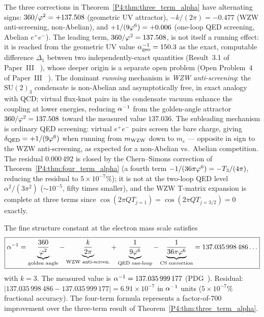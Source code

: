 \begin{remark}
\label{P4:rem:sign_pattern}
The three corrections in Theorem~\ref{P4:thm:three_term_alpha} have
alternating signs: $360/\varphi^2=+137.508$ (geometric UV attractor),
$-k/(2\pi)=-0.477$ (WZW anti-screening, non-Abelian), and
$+1/(9\varphi^6)=+0.006$ (one-loop QED screening, Abelian $e^+e^-$).
The leading term, $360/\varphi^2=137.508$, is not itself a running effect:
it is reached from the geometric UV value $\alpha^{-1}_{\mathrm{geo}}=150.3$
as the exact, computable difference $\Delta_1$ between two
independently-exact quantities (Result~3.1 of Paper~III~\cite{Paper3}%
), whose deeper origin is a separate open problem
(Open Problem~4 of Paper~III~\cite{Paper3}%
).
The dominant \emph{running} mechanism is \emph{WZW anti-screening}: the
$\mathrm{SU}(2)_3$ condensate is non-Abelian and asymptotically free, in
exact analogy with QCD; virtual flux-knot pairs in the condensate vacuum
enhance the coupling at lower energies, reducing $\alpha^{-1}$ from the
golden-angle attractor $360/\varphi^2=137.508$ toward the measured value
$137.036$.
The subleading mechanism is ordinary QED screening: virtual $e^+e^-$ pairs
screen the bare charge, giving $\delta_{\rm QED}=+1/(9\varphi^6)$ when running
from $m_{\mathrm{WZW}}$ down to $m_e$ --- opposite in sign to the WZW anti-screening,
as expected for a non-Abelian vs.\ Abelian competition.
The residual $0.000\,492$ is closed by the Chern--Simons correction of
Theorem~\ref{P4:thm:four_term_alpha} (a fourth term $-1/(36\pi\varphi^6)=-T_3/(4\pi)$,
reducing the residual to $5\times10^{-7}\%$); it is not at the two-loop
QED level $\alpha^2/(3\pi^2)$ ($\sim10^{-5}$, fifty times smaller), and the
WZW T-matrix expansion is complete at three terms since
$\cos(2\pi Q T_{j=1})=\cos(2\pi Q T_{j=3/2})=0$ exactly.
\end{remark}

\begin{theorem}
\label{P4:thm:four_term_alpha}
The fine structure constant at the electron mass scale satisfies
\begin{equation}
  \boxed{
  \alpha^{-1}
  = \underbrace{\frac{360}{\varphi^2}}_{\text{golden angle}}
  - \underbrace{\frac{k}{2\pi}}_{\text{WZW anti-screen.}}
  + \underbrace{\frac{1}{9\varphi^6}}_{\text{QED one-loop}}
  - \underbrace{\frac{1}{36\pi\varphi^6}}_{\text{CS correction}}
  = 137.035\,998\,486\ldots
  }
  \label{P4:eq:four_term}
\end{equation}
with $k=3$.  The measured value is $\alpha^{-1} = 137.035\,999\,177$
(PDG~\cite{PDG2024}).  Residual: $|137.035\,998\,486 - 137.035\,999\,177|
= 6.91\times10^{-7}$ in $\alpha^{-1}$ units
($5\times10^{-7}\%$ fractional accuracy).
The four-term formula represents a factor-of-700 improvement over the
three-term result of Theorem~\ref{P4:thm:three_term_alpha}.
\end{theorem}

